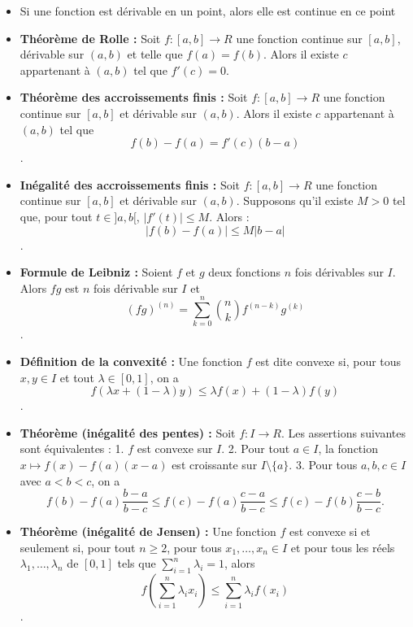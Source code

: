 \documentclass{article}
\begin{document}
\begin{itemize}[label=$\ast$]
	\item Si une fonction est dérivable en un point, alors elle est continue en ce point

	\item \textbf{Théorème de Rolle :} Soit \( f : [a, b] \rightarrow R \) une fonction continue sur \([a, b]\), dérivable sur \((a, b)\) et telle que \(f(a) = f(b)\). Alors il existe \(c\) appartenant à \((a, b)\) tel que \(f'(c) = 0\).

	\item \textbf{Théorème des accroissements finis :} Soit \( f : [a, b] \rightarrow R \) une fonction continue sur \([a, b]\) et dérivable sur \((a, b)\). Alors il existe \( c \) appartenant à \((a, b)\) tel que
\[ f(b) - f(a) = f'(c)(b - a) \].

	\item \textbf{Inégalité des accroissements finis :} Soit \( f : [a, b] \rightarrow R \) une fonction continue sur \([a, b]\) et dérivable sur \((a, b)\). Supposons qu'il existe \( M > 0 \) tel que, pour tout \( t \in ]a, b[ \), \( |f'(t)| \leq M \). Alors :
\[ |f(b) - f(a)| \leq M|b - a| \].

	\item \textbf{Formule de Leibniz :} Soient \( f \) et \( g \) deux fonctions \( n \) fois dérivables sur \( I \). Alors \( fg \) est \( n \) fois dérivable sur \( I \) et
\[ (fg)^{(n)} = \sum_{k=0}^{n} \binom{n}{k} f^{(n-k)}g^{(k)} \].

	\item \textbf{Définition de la convexité :} Une fonction \( f \) est dite convexe si, pour tous \( x, y \in I \) et tout \( \lambda \in [0, 1] \), on a
\[ f(\lambda x + (1-\lambda)y) \leq \lambda f(x) + (1-\lambda)f(y) \].

	\item \textbf{Théorème (inégalité des pentes) :} Soit \( f : I \rightarrow R \). Les assertions suivantes sont équivalentes :
1. \( f \) est convexe sur \( I \).
2. Pour tout \( a \in I \), la fonction \( x \mapsto f(x) - f(a)(x - a) \) est croissante sur \( I \setminus \{a\} \).
3. Pour tous \( a, b, c \in I \) avec \( a < b < c \), on a
   \[ f(b) - f(a) \frac{b - a}{b - c} \leq f(c) - f(a) \frac{c - a}{b - c} \leq f(c) - f(b) \frac{c - b}{b - c}. \]

	\item \textbf{Théorème (inégalité de Jensen) :} Une fonction \( f \) est convexe si et seulement si, pour tout \( n \geq 2 \), pour tous \( x_1, \ldots, x_n \in I \) et pour tous les réels \( \lambda_1, \ldots, \lambda_n \) de \( [0, 1] \) tels que \( \sum_{i=1}^{n} \lambda_i = 1 \), alors
\[ f\left(\sum_{i=1}^{n} \lambda_i x_i\right) \leq \sum_{i=1}^{n} \lambda_i f(x_i) \].





\end{itemize}
\end{document}
